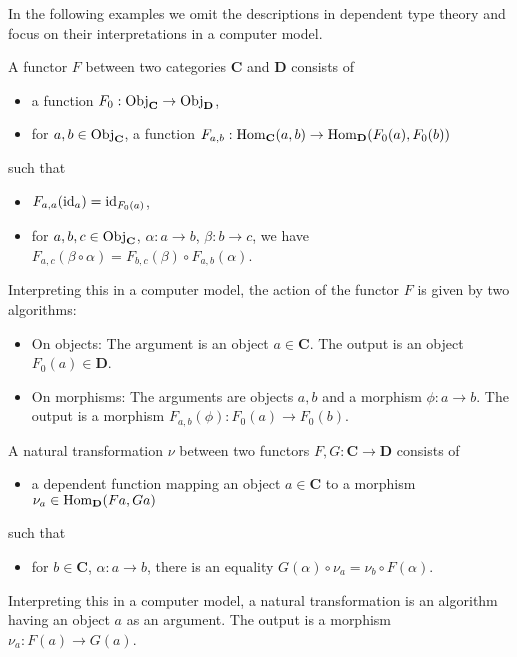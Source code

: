 In the following examples we omit the descriptions in dependent type theory
and focus on their interpretations in a computer model.

\begin{example}[Functors]
 A functor $F$ between two categories $\mathbf{C}$ and $\mathbf{D}$ consists of
 \begin{itemize}
  \item a function $F_{0}: \mathrm{Obj}_{\mathbf{C}} \rightarrow \mathrm{Obj}_{\mathbf{D}}$, 
  \item for $a,b \in \mathrm{Obj}_{\mathbf{C}}$, a function $F_{a,b}: \operatorname{\mathrm{Hom}}_{\mathbf{C}}(a,b) \rightarrow \operatorname{\mathrm{Hom}}_{\mathbf{D}}( F_0(a), F_0(b) )$
 \end{itemize}
 such that
 \begin{itemize}
  \item $F_{a,a}( \mathrm{id}_a ) = \mathrm{id}_{F_{0}(a)}$,
  \item for $a,b,c \in \mathrm{Obj}_{\mathbf{C}}$, $\alpha: a \rightarrow b$, $\beta: b \rightarrow c$, we have
        $F_{a,c}( \beta \circ \alpha ) = F_{b,c}( \beta ) \circ F_{a,b}( \alpha )$.
 \end{itemize}
 Interpreting this in a computer model, the action of the functor $F$ is given by two algorithms:
 \begin{itemize}
  \item On objects: The argument is an object $a \in \mathbf{C}$. The output is an object $F_0(a) \in \mathbf{D}$.
  \item On morphisms: The arguments are objects $a,b$ and a morphism $\phi: a \rightarrow b$. 
        The output is a morphism $F_{a,b}(\phi): F_0(a) \rightarrow F_0(b)$.
 \end{itemize}

\end{example}

\begin{example}
 A natural transformation $\nu$ between two functors $F,G: \mathbf{C} \rightarrow \mathbf{D}$ consists of
 \begin{itemize}
  \item a dependent function mapping an object $a \in \mathbf{C}$ to a morphism $\nu_{a} \in \operatorname{\mathrm{Hom}}_{\mathbf{D}}(Fa, Ga)$
 \end{itemize}
 such that 
 \begin{itemize}
  \item for $b \in \mathbf{C}$, $\alpha: a \rightarrow b$, there is an equality  $G(\alpha) \circ \nu_{a} = \nu_{b} \circ F(\alpha)$.
 \end{itemize}
 Interpreting this in a computer model, a natural transformation is an algorithm 
 having an object $a$ as an argument. The output is a morphism $\nu_a: F(a) \rightarrow G(a)$.
\end{example}

